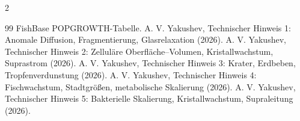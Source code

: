 \documentclass[11pt,a4paper]{article}
\begin{document}
\begin{multicols}{2}
\begin{thebibliography}{99}
			 FishBase POPGROWTH-Tabelle.
			 A. V. Yakushev, Technischer Hinweis 1: Anomale Diffusion, Fragmentierung, Glasrelaxation (2026).
			 A. V. Yakushev, Technischer Hinweis 2: Zelluläre Oberfläche–Volumen, Kristallwachstum, Suprastrom (2026).
			 A. V. Yakushev, Technischer Hinweis 3: Krater, Erdbeben, Tropfenverdunstung (2026).
			 A. V. Yakushev, Technischer Hinweis 4: Fischwachstum, Stadtgrößen, metabolische Skalierung (2026).
			 A. V. Yakushev, Technischer Hinweis 5: Bakterielle Skalierung, Kristallwachstum, Supraleitung (2026).
		\end{thebibliography}
		
	\end{multicols}
\end{document}
